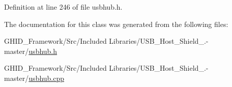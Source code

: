 \-Definition at line 246 of file usbhub.\-h.



\-The documentation for this class was generated from the following files\-:\begin{DoxyCompactItemize}
\item 
\-G\-H\-I\-D\-\_\-\-Framework/\-Src/\-Included Libraries/\-U\-S\-B\-\_\-\-Host\-\_\-\-Shield\-\_.-\/master/\hyperlink{usbhub_8h}{usbhub.\-h}\item 
\-G\-H\-I\-D\-\_\-\-Framework/\-Src/\-Included Libraries/\-U\-S\-B\-\_\-\-Host\-\_\-\-Shield\-\_.-\/master/\hyperlink{usbhub_8cpp}{usbhub.\-cpp}\end{DoxyCompactItemize}
